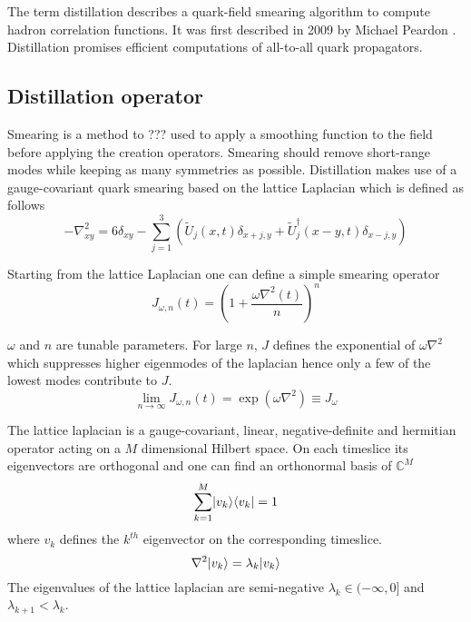 	
The term distillation describes a quark-field smearing algorithm to compute hadron correlation functions. It was first described in 2009 by Michael Peardon \cite{distillation_paper}. Distillation promises efficient computations of all-to-all quark propagators.\\

\subsection{Distillation operator}
    Smearing is a method to ??? used to apply a smoothing function to the field before applying the creation operators. Smearing should remove short-range modes while keeping as many symmetries as possible. Distillation makes use of a gauge-covariant quark smearing based on the lattice Laplacian which is defined as follows
	\begin{equation}
	    -\nabla^2_{xy} = 6\delta_{xy} - \sum^3_{j=1}(\tilde{U}_j(x,t)\delta_{x+j,y} + \tilde{U}^\dagger_j(x-y,t)\delta_{x-j,y})
	\end{equation}
	
	Starting from the lattice Laplacian one can define a simple smearing operator
	\begin{equation}
	    J_{\omega,n}(t) = (1+\frac{\omega\nabla^2(t)}{n})^n
	\end{equation}
	
	$\omega$ and $n$ are tunable parameters. For large $n$, $J$ defines the exponential of $\omega\nabla^2$ which suppresses higher eigenmodes of the laplacian hence only a few of the lowest modes contribute to $J$. %
	\begin{equation}
        \lim_{n\rightarrow\infty} J_{\omega,n}(t) = \exp(\omega\nabla^2) \equiv J_\omega
	\end{equation}
	
    The lattice laplacian is a gauge-covariant, linear, negative-definite and hermitian operator acting on a $M$ dimensional Hilbert space. On each timeslice its eigenvectors are orthogonal and one can find an orthonormal basis of $\mathbb{C}^M$
    \cite{bachelor_thesis_jan}
    \begin{equation}\label{othonormal_eigenvectors}
        \sum^M_{k=1}\lvert v_k\rangle\langle v_k\rvert = 1
    \end{equation}
    where $v_k$ defines the $k^{th}$ eigenvector on the corresponding timeslice.
    \begin{equation}
        \nabla^2\lvert v_k\rangle = \lambda_k\lvert v_k\rangle
    \end{equation}
    The eigenvalues of the lattice laplacian are semi-negative $\lambda_k \in (-\infty,0]$ and $\lambda_{k+1} < \lambda_k$.\\
    

